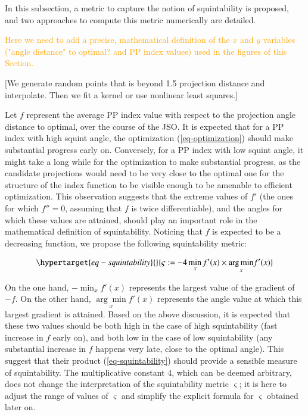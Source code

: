 \documentclass[
  number,
  preprint,
  3p]{elsarticle}
\begin{document}
In this subsection, a metric to capture the notion of squintability is
proposed, and two approaches to compute this metric numerically are
detailed.

\textcolor{orange}{Here we need to add a precise, mathematical
definition of the $x$ and $y$ variables ("angle distance" to optimal?
and PP index values) used in the figures of this Section.}

{[}We generate random points that is beyond 1.5 projection distance and
interpolate. Then we fit a kernel or use nonlinear least squares.{]}

Let \(f\) represent the average PP index value with respect to the
projection angle distance to optimal, over the course of the JSO. It is
expected that for a PP index with high squint angle, the optimization
(\ref{eq-optimization}) should make substantial progress early on.
Conversely, for a PP index with low squint angle, it might take a long
while for the optimization to make substantial progress, as the
candidate projections would need to be very close to the optimal one for
the structure of the index function to be visible enough to be amenable
to efficient optimization. This observation suggests that the extreme
values of \(f'\) (the ones for which \(f''=0\), assuming that \(f\) is
twice differentiable), and the angles for which these values are
attained, should play an important role in the mathematical definition
of squintability. Noticing that \(f\) is expected to be a decreasing
function, we propose the following squintability metric:

\begin{equation}\protect\hypertarget{eq-squintability}{}{
\varsigma:=-4\min_{x}f'(x)\times\underset{x}{\arg\min}f'(x)
}\label{eq-squintability}\end{equation}

On the one hand, \(-\min_{x}f'(x)\) represents the largest value of the
gradient of \(-f\). On the other hand, \(\underset{x}{\arg\min}f'(x)\)
represents the angle value at which this largest gradient is attained.
Based on the above discussion, it is expected that these two values
should be both high in the case of high squintability (fast increase in
\(f\) early on), and both low in the case of low squintability (any
substantial increase in \(f\) happens very late, close to the optimal
angle). This suggest that their product (\ref{eq-squintability}) should
provide a sensible measure of squintability. The multiplicative constant
\(4\), which can be deemed arbitrary, does not change the interpretation
of the squintability metric \(\varsigma\); it is here to adjust the
range of values of \(\varsigma\) and simplify the explicit formula for
\(\varsigma\) obtained later on.
\end{document}
